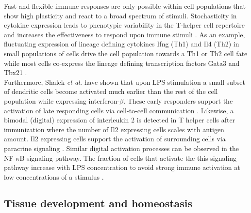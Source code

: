 Fast and flexible immune responses are only possible within cell populations that show high plasticity and react to a broad spectrum of stimuli. Stochasticity in cytokine expression leads to phenotypic variability in the T-helper cell repertoire and increases the effectiveness to respond upon immune stimuli \citep{Schrom2017}. As an example, fluctuating expression of lineage defining cytokines Ifng (Th1) and Il4 (Th2) in small populations of cells drive the cell population towards a Th1 or Th2 cell fate while most cells co-express the lineage defining transcription factors Gata3 and Tbx21 \citep{Fang2013a, Antebi2013}.\\
Furthermore, Shalek \textit{et al.} have shown that upon LPS stimulation a small subset of dendritic cells become activated much earlier than the rest of the cell population while expressing interferon-$\beta$. These early responders support the activation of late responding cells via cell-to-cell communication \citep{Shalek2014}. Likewise, a bimodal (digital) expression of interleukin 2 is detected in T helper cells after immunization where the number of Il2 expressing cells scales with antigen amount. Il2 expressing cells support the activation of surrounding cells via paracrine signaling \citep{Fuhrmann2016}. Similar digital activation processes can be observed in the NF-$\kappa$B signaling pathway. The fraction of cells that activate the this signaling pathway increase with LPS concentration to avoid strong immune activation at low concentrations of a stimulus \citep{Kellogg2015b}.


\subsection{Tissue development and homeostasis}

